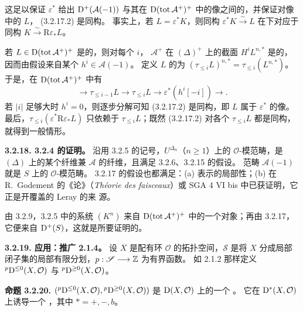 这足以保证 $\varepsilon^*$ 给出
$\mathrm{D}^+(\mathcal A(-1))$ 与其在 $\mathrm{D}(\operatorname{tot}\mathcal A^+)^+$
中的像之间的，并保证对像中的 $L$， (3.2.17.2) 是同构。
事实上，若 $L=\varepsilon^*K$，则同构
$\varepsilon^*K\xrightarrow{\sim}L$ 在下对应于同构
$K\xrightarrow{\sim}\mathrm R\varepsilon_*L$。

若 $L\in\mathrm{D}(\operatorname{tot}\mathcal A^+)^+$ 是的，则对每个 $i$，
$\mathcal A^+$ 在 $(\Delta)^+$ 上的截面 $H^iL^{n,*}$ 是的，因而由假设来自某个 $h^i\in\mathcal A(-1)$。
定义 $L$ 的为
$(\tau_{\leq i}L)^{n,*}=\tau_{\leq i}(L^{n,*})$。
于是，在 $\mathrm{D}(\operatorname{tot}\mathcal A^+)^+$ 中有
\[
\longrightarrow\tau_{\leq i-1}L\longrightarrow\tau_{\leq i}L
 \longrightarrow\varepsilon^*(h^i[-i])\longrightarrow.
\]
若 $|i|$ 足够大时 $h^i=0$，则逐步分解可知 (3.2.17.2) 是同构，即
$L$ 属于 $\varepsilon^*$ 的像。
最后，$\tau_{\leq i}(\varepsilon^*\mathrm R\varepsilon_*L)$ 只依赖于
$\tau_{\leq i}L$；既然 (3.2.17.2) 对各个 $\tau_{\leq i}L$ 都是同构，就得到一般情形。

\par\medskip\noindent\textbf{3.2.18. 3.2.4 的证明。}
沿用 3.2.5 的记号，$U^{\Delta_n}$（$n\geq1$）上的
$\mathcal O$-模范畴，是 $(\Delta)$ 上的某个纤维兼
$\mathcal A$ 的纤维，且满足 3.2.6、3.2.15 的假设。
范畴 $\mathcal A(-1)$ 就是 $S$ 上的 $\mathcal O$-模范畴。
3.2.17 的假设也都满足：(a) 表示的局部性；(b) 在 R.~Godement 的《论》（\emph{Théorie des faisceaux}）或 SGA 4 VI bis 中已获证明，它正是开覆盖的 Leray 的来
源。

由 3.2.9，3.2.5 中的系统 $(K^n)$ 来自
$\mathrm{D}(\operatorname{tot}\mathcal A^+)^+$ 中的一个对象；再由 3.2.17，它便来自
$\mathrm{D}^+(S)$，这就是所要证明的。

\par\medskip\noindent\textbf{3.2.19. 应用：推广 2.1.4。}
设 $X$ 是配有环 $\mathcal O$ 的拓扑空间，$\mathscr S$ 是将 $X$
分成局部闭子集的局部有限分划，$p:\mathscr S\longrightarrow\mathbb Z$ 为有界函数。
如 2.1.2 那样定义 ${}^p\mathrm{D}^{\leq0}(X,\mathcal O)$ 与
${}^p\mathrm{D}^{\geq0}(X,\mathcal O)$。

\par\medskip\noindent\textbf{命题 3.2.20.}
$({}^p\mathrm{D}^{\leq0}(X,\mathcal O),\allowbreak{}^p\mathrm{D}^{\geq0}(X,\mathcal O))$
是 $\mathrm{D}(X,\mathcal O)$ 上的一个 。
它在 $\mathrm{D}^*(X,\mathcal O)$ 上诱导一个 ，其中 $*=+,-,b$。

